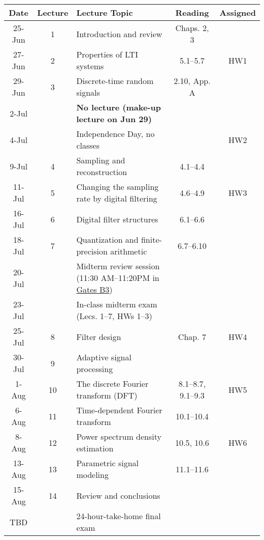 \begin{tabular}{c|c|l|c|c}
	\hline
	Date & Lecture	& Lecture Topic	& Reading\footnotemark & Assigned \\
	\hline
	25-Jun	& 1 &	Introduction and review			& Chaps. 2, 3	& \\
	27-Jun	& 2 &	Properties of LTI systems 		& 5.1--5.7 	& HW1 \\
	29-Jun 	& 3 & 	Discrete-time random signals	& 2.10, App. A \\
	\hline
	2-Jul	& 	& 	\textbf{No lecture (make-up lecture on Jun 29)}	&  & \\
	4-Jul	&  & 	Independence Day, no classes  	&		& HW2 \\
	\hline
	9-Jul	& 4 & 	Sampling and reconstruction  	& 4.1--4.4 	& \\
	11-Jul	& 5	& 	Changing the sampling rate by digital filtering	& 4.6--4.9 		& HW3 \\
	\hline
	16-Jul	& 6	& 	Digital filter structures				& 6.1--6.6 & \\
	18-Jul	& 7	& 	Quantization and finite-precision arithmetic &	6.7--6.10	& \\
	20-Jul	& 	& 	Midterm review session (11:30 AM--11:20PM in \href{https://campus-map.stanford.edu/?srch=Gates+Computer+Science}{Gates B3})  & & \\
	\hline
	23-Jul	& 	& 	In-class midterm exam (Lecs. 1--7, HWs 1--3) & & \\
	25-Jul	& 8	& 	Filter design & Chap. 7	& HW4 \\
	\hline
	30-Jul	& 9 & 	Adaptive signal processing & & \\
	1-Aug	& 10 & 	The discrete Fourier transform (DFT) & 8.1--8.7, 9.1--9.3	& HW5 \\
	\hline
	6-Aug	& 11 & 	Time-dependent Fourier transform	& 10.1--10.4 & \\
	8-Aug	& 12 & 	Power spectrum density estimation & 10.5, 10.6 & HW6 \\
	\hline
	13-Aug	& 13 & 	Parametric signal modeling 	& 11.1--11.6	& \\
	15-Aug 	& 14 & 	Review and conclusions &  & 	\\
	TBD	& 	 & 	24-hour-take-home final exam & \\
	\hline
\end{tabular}